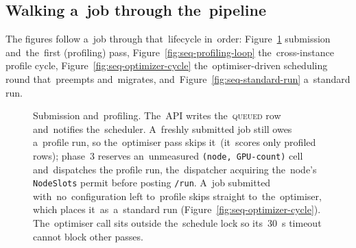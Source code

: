 \subsection{Walking a~job through the~pipeline}

The figures follow a~job through that~lifecycle in~order:
Figure~\ref{fig:seq-submit} submission and~the~first (profiling) pass,
Figure~\ref{fig:seq-profiling-loop} the~cross-instance profile cycle,
Figure~\ref{fig:seq-optimizer-cycle} the~optimiser-driven scheduling round
that~preempts and~migrates, and~Figure~\ref{fig:seq-standard-run} a~standard
run.

\begin{figure}[H]
\centering
\footnotesize
\setlength{\unitlength}{0.7cm}
\caption{Submission and~profiling.  The~API writes the~\textsc{queued} row
and~notifies the~scheduler.  A~freshly submitted job still owes a~profile
run, so the~optimiser pass skips it~(it~scores only profiled rows); phase~3
reserves an~unmeasured \texttt{(node, GPU-count)} cell and~dispatches the
profile run, the~dispatcher acquiring the~node's \texttt{NodeSlots} permit
before posting \texttt{/run}.  A~job submitted with~no~configuration left
to~profile skips straight to~the~optimiser, which places it~as~a~standard
run (Figure~\ref{fig:seq-optimizer-cycle}).  The~optimiser call sits outside
the~schedule lock so its~30~s timeout cannot block other passes.}
\label{fig:seq-submit}
\end{figure}

